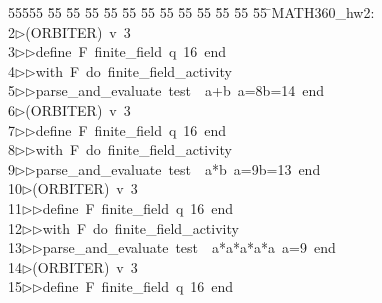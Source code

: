 %
%
\begin{tabbing}
55555 \= 55 \= 55 \= 55 \= 55 \= 55 \= 55 \= 55 \= 55 \= 55 \= 55 \= 55 \= 55 \= \>MATH360\_hw2:\\[0pt]
2\>$\triangleright$\>(ORBITER)\ v\ 3\ \\[0pt]
3\>$\triangleright$\>$\triangleright$\>define\ F\ finite\_field\ q\ 16\ end\ \\[0pt]
4\>$\triangleright$\>$\triangleright$\>with\ F\ do\ finite\_field\_activity\ \\[0pt]
5\>$\triangleright$\>$\triangleright$\>parse\_and\_evaluate\ test\ \ a+b\ a=8b=14\ end\\[0pt]
6\>$\triangleright$\>(ORBITER)\ v\ 3\ \\[0pt]
7\>$\triangleright$\>$\triangleright$\>define\ F\ finite\_field\ q\ 16\ end\ \\[0pt]
8\>$\triangleright$\>$\triangleright$\>with\ F\ do\ finite\_field\_activity\ \\[0pt]
9\>$\triangleright$\>$\triangleright$\>parse\_and\_evaluate\ test\ \ a*b\ a=9b=13\ end\\[0pt]
10\>$\triangleright$\>(ORBITER)\ v\ 3\ \\[0pt]
11\>$\triangleright$\>$\triangleright$\>define\ F\ finite\_field\ q\ 16\ end\ \\[0pt]
12\>$\triangleright$\>$\triangleright$\>with\ F\ do\ finite\_field\_activity\ \\[0pt]
13\>$\triangleright$\>$\triangleright$\>parse\_and\_evaluate\ test\ \ a*a*a*a*a\ a=9\ end\\[0pt]
14\>$\triangleright$\>(ORBITER)\ v\ 3\ \\[0pt]
15\>$\triangleright$\>$\triangleright$\>define\ F\ finite\_field\ q\ 16\ end\ \\[0pt]

\end{tabbing}
